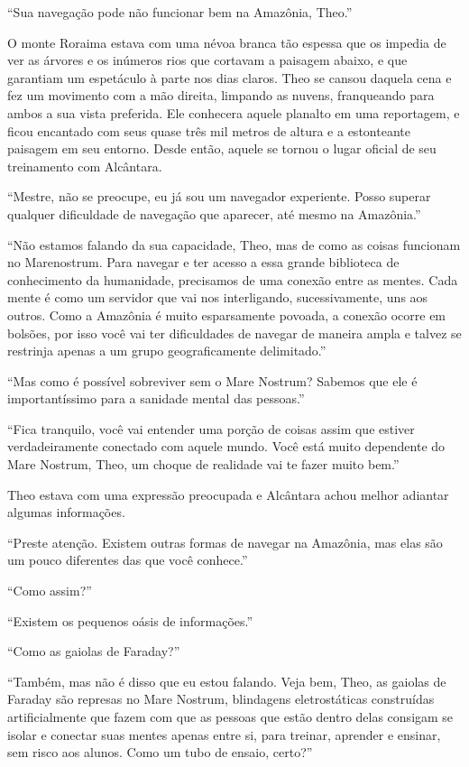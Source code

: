 ``Sua navegação pode não funcionar bem na Amazônia, Theo.''

O monte Roraima estava com uma névoa branca tão espessa que os impedia
de ver as árvores e os inúmeros rios que cortavam a paisagem abaixo, e
que garantiam um espetáculo à parte nos dias claros. Theo se cansou
daquela cena e fez um movimento com a mão direita, limpando as nuvens,
franqueando para ambos a sua vista preferida. Ele conhecera aquele
planalto em uma reportagem, e ficou encantado com seus quase três mil
metros de altura e a estonteante paisagem em seu entorno. Desde então,
aquele se tornou o lugar oficial de seu treinamento com Alcântara.

``Mestre, não se preocupe, eu já sou um navegador experiente. Posso
superar qualquer dificuldade de navegação que aparecer, até mesmo na
Amazônia.''

``Não estamos falando da sua capacidade, Theo, mas de como as coisas
funcionam no Marenostrum. Para navegar e ter acesso a essa grande
biblioteca de conhecimento da humanidade, precisamos de uma conexão entre
as mentes. Cada mente é como um servidor que vai nos interligando,
sucessivamente, uns aos outros. Como a Amazônia é muito esparsamente
povoada, a conexão ocorre em bolsões, por isso você vai ter dificuldades
de navegar de maneira ampla e talvez se restrinja apenas a um grupo
geograficamente delimitado.''

``Mas como é possível sobreviver sem o Mare Nostrum? Sabemos que ele é
importantíssimo para a sanidade mental das pessoas.''

``Fica tranquilo, você vai entender uma porção de coisas assim que
estiver verdadeiramente conectado com aquele mundo. Você está muito
dependente do Mare Nostrum, Theo, um choque de realidade vai te fazer
muito bem.''

Theo estava com uma expressão preocupada e Alcântara achou melhor
adiantar algumas informações.

``Preste atenção. Existem outras formas de navegar na Amazônia,
mas elas são um pouco diferentes das que você conhece.''

``Como assim?''

``Existem os pequenos oásis de informações.''

``Como as gaiolas de Faraday?''

``Também, mas não é disso que eu estou falando. Veja bem, Theo, as
gaiolas de Faraday são represas no Mare Nostrum, blindagens
eletrostáticas construídas artificialmente que fazem com que as pessoas
que estão dentro delas consigam se isolar e conectar suas mentes apenas
entre si, para treinar, aprender e ensinar, sem risco aos alunos. Como
um tubo de ensaio, certo?''

